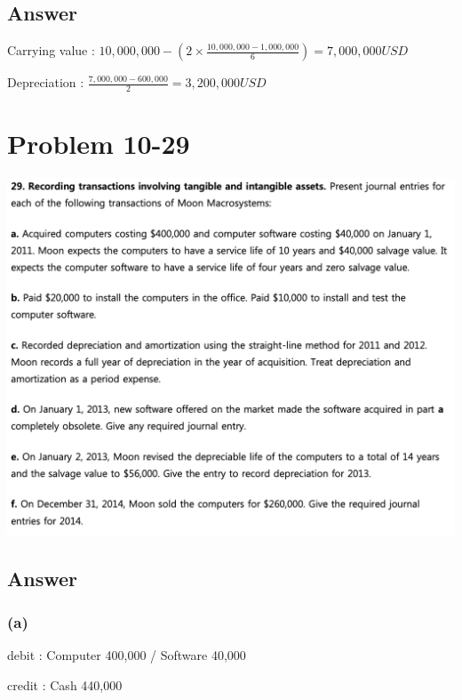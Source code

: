 \documentclass[
  a4paper,
  DIV=11,
  numbers=noendperiod]{scrreprt}
\begin{document}
\subsection*{Answer}\label{answer-16}

Carrying value :
\(10,000,000-(2\times\frac{10,000,000-1,000,000}{6})=7,000,000USD\)

Depreciation : \(\frac{7,000,000-600,000}{2}=3,200,000USD\)

\section*{Problem 10-29}\label{problem-10-29}


\includegraphics{images/재무회계_10-29.png}

\subsection*{Answer}\label{answer-17}

\subsubsection*{(a)}\label{a-1}

debit : Computer 400,000 / Software 40,000

credit : Cash 440,000
\end{document}

